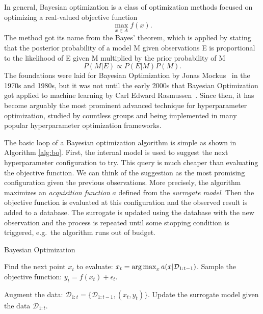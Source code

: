In general, Bayesian optimization is a class of optimization methods focused on optimizing a real-valued objective function \[ \max_{x\in A} f(x). \] The method got its name from the Bayes' theorem, which is applied by stating that the posterior probability of a model M given observations E is proportional to the likelihood of E given M multiplied by the prior probability of M \[ P(M|E) \propto P(E|M)P(M).\] The foundations were laid for Bayesian Optimization by Jonas Mockus~\cite{mockus1974bayesian} in the 1970s and 1980s, but it was not until the early 2000s that Bayesian Optimization got applied to machine learning by Carl Edward Rasmussen~\cite{rasmussen2003gaussian}. Since then, it has become arguably the most prominent advanced technique for hyperparameter optimization, studied by countless groups and being implemented in many popular hyperparameter optimization frameworks.

The basic loop of a Bayesian optimization algorithm is simple as shown in Algorithm \ref{alg:bo}. First, the internal model is used to suggest the next hyperparameter configuration to try. This query is much cheaper than evaluating the objective function. We can think of the suggestion as the most promising configuration given the previous observations. More precisely, the algorithm maximizes an \textit{acquisition function} $a$ defined from the \textit{surrogate model}. Then the objective function is evaluated at this configuration and the observed result is added to a database. The surrogate is updated using the database with the new observation and the process is repeated until some stopping condition is triggered, e.g.\ the algorithm runs out of budget.


\begin{algorithm}
    \caption{Bayesian Optimization}
    \begin{algorithmic}[1]
        \State Find the next point $x_t$ to evaluate: $x_t = \operatorname*{arg\,max}_{x} a(x|\mathcal{D}_{1:t-1})$.
        \State Sample the objective function:  $y_t = f(x_t)+ \epsilon_t$.

        \State Augment the data: $\mathcal{D}_{1:t}= \{\mathcal{D}_{1:t-1},(x_t, y_t)\}$.
        \State Update the surrogate model given the data $\mathcal{D}_{1:t}$.
    \EndFor
    \end{algorithmic}
    \label{alg:bo}
\end{algorithm}

